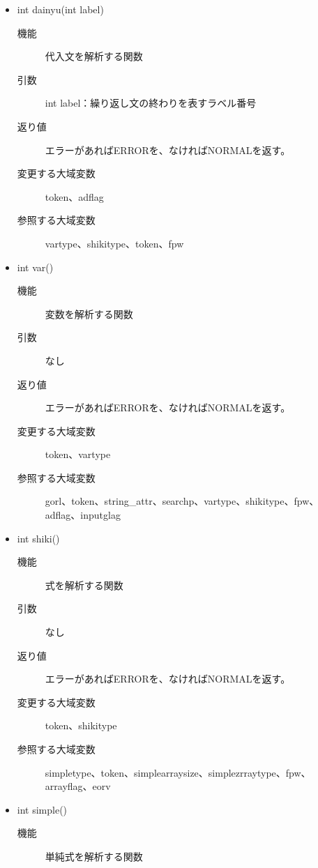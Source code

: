 \documentclass{jarticle}
\begin{document}
\begin{itemize}
\begin{description}
\item[機能]式の並びを解析する関数
\item[引数]なし
\item[返り値]エラーがあればERRORを、なければNORMALを返す。
\item[変更する大域変数]token、expnum、eorv、stringhead、stringtail
\item[参照する大域変数]token、searchp、shikitype、eorv、fpw、stringhead
\end{description}
\item int dainyu(int label)
\begin{description}
\item[機能]代入文を解析する関数
\item[引数]int label：繰り返し文の終わりを表すラベル番号
\item[返り値]エラーがあればERRORを、なければNORMALを返す。
\item[変更する大域変数]token、adflag
\item[参照する大域変数]vartype、shikitype、token、fpw
\end{description}
\item int var()
\begin{description}
\item[機能]変数を解析する関数
\item[引数]なし
\item[返り値]エラーがあればERRORを、なければNORMALを返す。
\item[変更する大域変数]token、vartype
\item[参照する大域変数]gorl、token、string\_attr、searchp、vartype、shikitype、fpw、adflag、inputglag
\end{description}
\item int shiki()
\begin{description}
\item[機能]式を解析する関数
\item[引数]なし
\item[返り値]エラーがあればERRORを、なければNORMALを返す。
\item[変更する大域変数]token、shikitype
\item[参照する大域変数]simpletype、token、simplearraysize、simplezrraytype、fpw、arrayflag、eorv
\end{description}
\item int simple()
\begin{description}
\item[機能]単純式を解析する関数

\end{description}
\end{itemize}
\end{document}
